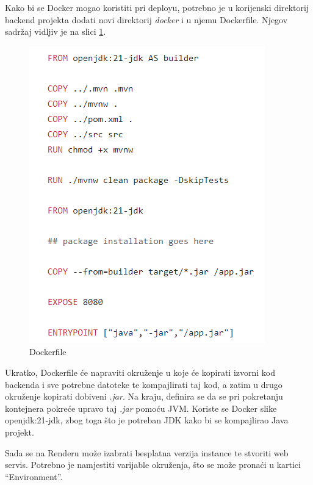 			 Kako bi se Docker mogao koristiti pri deployu, potrebno je u korijenski direktorij backend projekta dodati novi direktorij \textit{docker} i u njemu Dockerfile. Njegov sadržaj vidljiv je na slici \ref{fig:docker1}.
			 
			 \begin{figure}[H]
			 	\includegraphics[width=\textwidth]{slike/docker.PNG} %
			 	\caption{Dockerfile}
			 	\label{fig:docker1} %
			 \end{figure}
			 
			 Ukratko, Dockerfile će napraviti okruženje u koje će kopirati izvorni kod backenda i sve potrebne datoteke te kompajlirati taj kod, a zatim u drugo okruženje kopirati dobiveni \textit{.jar}. Na kraju, definira se da se pri pokretanju kontejnera pokreće upravo taj \textit{.jar} pomoću JVM. Koriste se Docker slike openjdk:21-jdk, zbog toga što je potreban JDK kako bi se kompajlirao Java projekt.
			 
			 Sada se na Renderu može izabrati besplatna verzija instance te stvoriti web servis. Potrebno je namjestiti varijable okruženja, što se može pronaći u kartici “Environment”.
			 
